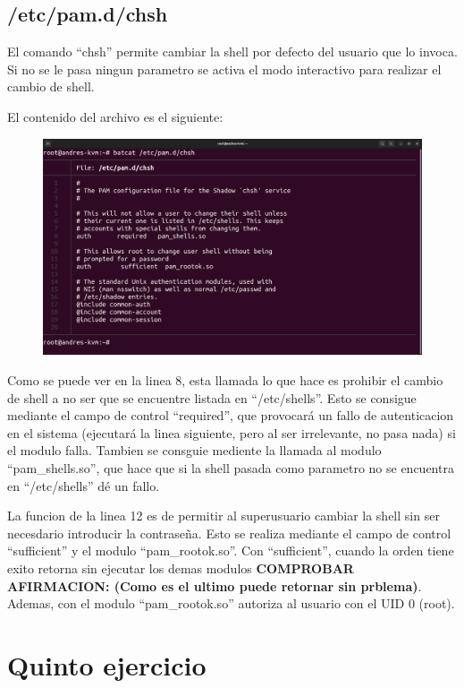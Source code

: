 \documentclass{article}
\begin{document}
\subsection{/etc/pam.d/chsh}
El comando ``chsh'' permite cambiar la shell por defecto del usuario que lo invoca. Si no se le pasa ningun parametro se activa el modo interactivo para realizar el cambio de shell.

El contenido del archivo es el siguiente:

\begin{figure}[H]
    \includegraphics[width=\textwidth]{imagenes/pamchsh.png}
\end{figure}


Como se puede ver en la linea 8, esta llamada lo que hace es prohibir el cambio de shell a no ser que se encuentre listada en ``/etc/shells''. Esto se consigue mediante el campo de control ``required'', que provocará un fallo de autenticacion en el sistema (ejecutará la linea siguiente, pero al ser irrelevante, no pasa nada) si el modulo falla. Tambien se consguie mediente la llamada al modulo ``pam\_shells.so'', que hace que si la shell pasada como parametro no se encuentra en ``/etc/shells'' dé un fallo.

La funcion de la linea 12 es de permitir al superusuario cambiar la shell sin ser necesdario introducir la contraseña. Esto se realiza mediante el campo de control ``sufficient'' y el modulo ``pam\_rootok.so''. Con ``sufficient'', cuando la orden tiene exito retorna sin ejecutar los demas modulos \textbf{COMPROBAR AFIRMACION: (Como es el ultimo puede retornar sin prblema)}. Ademas, con el modulo ``pam\_rootok.so'' autoriza al usuario con el UID 0 (root).


\section{Quinto ejercicio}
\end{document}
